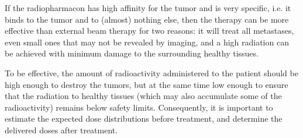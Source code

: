 If the radiopharmacon has high affinity for the tumor and is very
specific, i.e. it binds to the tumor and to (almost) nothing else,
then the therapy can be more effective than external beam therapy for
two reasons: it will treat all metastases, even small ones that may
not be revealed by imaging, and a high radiation can be achieved with
minimum damage to the surrounding healthy tissues.

To be effective, the amount of radioactivity administered to the
patient should be high enough to destroy the tumors, but at the same
time low enough to ensure that the radiation to healthy tissues (which
may also accumulate some of the radioactivity) remains below safety
limits. Consequently, it is important to estimate the expected dose
distributions before treatment, and determine the delivered doses
after treatment.

